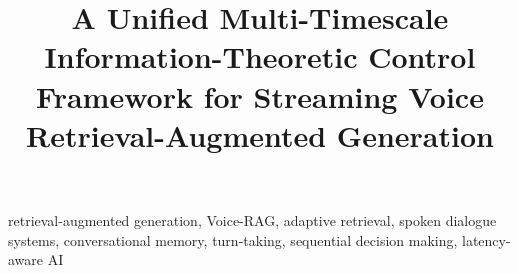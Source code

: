 \documentclass[conference]{IEEEtran}
\begin{document}
\title{A Unified Multi-Timescale Information-Theoretic Control Framework for
Streaming Voice Retrieval-Augmented Generation}

\author{
}

\maketitle

\begin{abstract}

\end{abstract}

\begin{IEEEkeywords}
retrieval-augmented generation, Voice-RAG, adaptive retrieval,
spoken dialogue systems, conversational memory, turn-taking,
sequential decision making, latency-aware AI
\end{IEEEkeywords}

%













\end{document}
